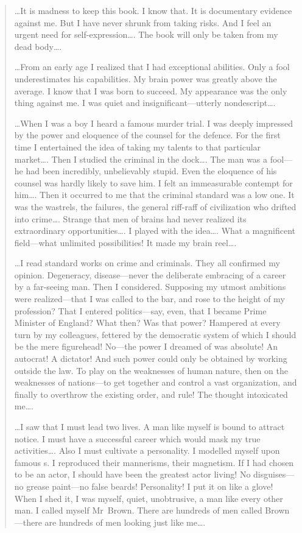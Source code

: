 \begin{quotation}
\dots It is madness to keep this book. I know that. It is documentary evidence against me. But I have never shrunk from taking risks. And I feel an urgent need for self-expression\dots. The book will only be taken from my dead body\dots.

\dots From an early age I realized that I had exceptional abilities. Only a fool underestimates his capabilities. My brain power was greatly above the average. I know that I was born to succeed. My appearance was the only thing against me. I was quiet and insignificant—utterly nondescript\dots.

\dots When I was a boy I heard a famous murder trial. I was deeply impressed by the power and eloquence of the counsel for the defence. For the first time I entertained the idea of taking my talents to that particular market\dots. Then I studied the criminal in the dock\dots. The man was a fool—he had been incredibly, unbelievably stupid. Even the eloquence of his counsel was hardly likely to save him. I felt an immeasurable contempt for him\dots. Then it occurred to me that the criminal standard was a low one. It was the wastrels, the failures, the general riff-raff of civilization who drifted into crime\dots. Strange that men of brains had never realized its extraordinary opportunities\dots. I played with the idea\dots. What a magnificent field—what unlimited possibilities! It made my brain reel\dots.

\dots I read standard works on crime and criminals. They all confirmed my opinion. Degeneracy, disease—never the deliberate embracing of a career by a far-seeing man. Then I considered. Supposing my utmost ambitions were realized—that I was called to the bar, and rose to the height of my profession? That I entered politics—say, even, that I became Prime Minister of England? What then? Was that power? Hampered at every turn by my colleagues, fettered by the democratic system of which I should be the mere figurehead! No—the power I dreamed of was absolute! An autocrat! A dictator! And such power could only be obtained by working outside the law. To play on the weaknesses of human nature, then on the weaknesses of nations—to get together and control a vast organization, and finally to overthrow the existing order, and rule! The thought intoxicated me\dots.

\dots I saw that I must lead two lives. A man like myself is bound to attract notice. I must have a successful career which would mask my true activities\dots. Also I must cultivate a personality. I modelled myself upon famous s. I reproduced their mannerisms, their magnetism. If I had chosen to be an actor, I should have been the greatest actor living! No disguises—no grease paint—no false beards! Personality! I put it on like a glove! When I shed it, I was myself, quiet, unobtrusive, a man like every other man. I called myself Mr~Brown. There are hundreds of men called Brown—there are hundreds of men looking just like me\dots.


\end{quotation}
